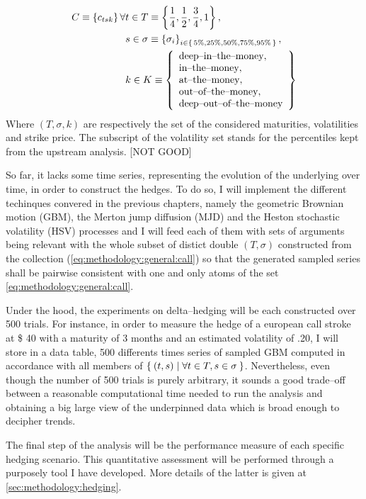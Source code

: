 \documentclass[12pt]{report}
\begin{document}
\begin{align}
C \equiv \left\{ c_{t s k} \right\} \forall & t \in T \equiv \left\{ \frac{1}{4}, \frac{1}{2}, \frac{3}{4}, 1\right\}, \label{eq:methodology:general:call}\\
& s \in \sigma \equiv \left\{ \sigma_i \right\}_{i \in \set{5\%, 25\%, 50\%, 75\%, 95\% }}, \nonumber \\
& k \in K \equiv 
\left\{ \begin{array}{l}
\text{deep--in--the--money},\\
\text{in--the--money},\\
\text{at--the--money},\\
\text{out--of--the--money},\\
\text{deep--out--of--the--money}
\end{array} \right\} \nonumber
\end{align}
Where $(T, \sigma, k)$ are respectively the set of the considered maturities, volatilities and strike price. The subscript of the volatility set stands for the percentiles kept from the upstream analysis. [NOT GOOD]

So far, it lacks some time series, representing the evolution of the underlying over time, in order to construct the hedges.
To do so, I will implement the different techinques convered in the previous chapters, namely the geometric Brownian motion (GBM), the Merton jump diffusion (MJD) and the Heston stochastic volatility (HSV) processes and I will feed each of them with sets of arguments being relevant with the whole subset of distict double $(T, \sigma)$ constructed from the collection (\ref{eq:methodology:general:call}) so that the generated sampled series shall be pairwise consistent with one and only atoms of the set \ref{eq:methodology:general:call}.

Under the hood, the experiments on delta--hedging will be each constructed over 500 trials.
For instance, in order to measure the hedge of a european call stroke at \$ 40 with a maturity of 3 months and an estimated volatility of .20, I will store in a data table, 500 differents times series of sampled GBM computed in accordance with all members of $\Set{(t, s) | \forall t \in T, s \in \sigma}$.
Nevertheless, even though the number of 500 trials is purely arbitrary, it sounds a good trade--off between a reasonable computational time needed to run the analysis  and obtaining a big large view of the underpinned data which is broad enough to decipher trends.

The final step of the analysis will be the performance measure of each specific hedging scenario.
This quantitative assessment will be performed through a purposely tool I have developed.
More details of the latter is given at \cref{sec:methodology:hedging}.
\end{document}
